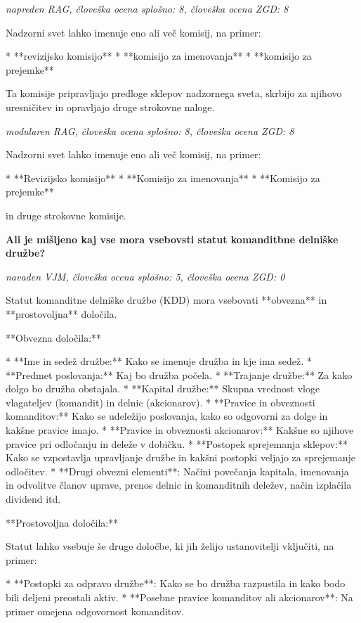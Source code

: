 \documentclass[a4paper,12pt,openright]{book}
\begin{document}
\vspace{0.5cm}
\textit{napreden RAG, človeška ocena splošno: 8, človeška ocena ZGD: 8}

Nadzorni svet lahko imenuje eno ali več komisij, na primer:

* **revizijsko komisijo**
* **komisijo za imenovanja**
* **komisijo za prejemke**


Ta komisije pripravljajo predloge sklepov nadzornega sveta, skrbijo za njihovo uresničitev in opravljajo druge strokovne naloge.

\vspace{0.5cm}
\textit{modularen RAG, človeška ocena splošno: 8, človeška ocena ZGD: 8}

Nadzorni svet lahko imenuje eno ali več komisij, na primer:

* **Revizijsko komisijo**
* **Komisijo za imenovanja**
* **Komisijo za prejemke**


in druge strokovne komisije.

\vspace{0.5cm}
\textbf{Ali je mišljeno kaj vse mora vsebovsti statut komanditbne delniške družbe?}

\textit{navaden VJM, človeška ocena splošno: 5, človeška ocena ZGD: 0}

Statut komanditne delniške družbe (KDD) mora vsebovati **obvezna** in **prostovoljna** določila.

**Obvezna določila:**

* **Ime in sedež družbe:** Kako se imenuje družba in kje ima sedež.
* **Predmet poslovanja:** Kaj bo družba počela.
* **Trajanje družbe:** Za kako dolgo bo družba obstajala.
* **Kapital družbe:** Skupna vrednost vloge vlagateljev (komandit) in delnic (akcionarov).
* **Pravice in obveznosti komanditov:** Kako se udeležijo poslovanja, kako so odgovorni za dolge in kakšne pravice imajo.
* **Pravice in obveznosti akcionarov:** Kakšne so njihove pravice pri odločanju in deleže v dobičku.
* **Postopek sprejemanja sklepov:** Kako se vzpostavlja upravljanje družbe in kakšni postopki veljajo za sprejemanje odločitev.
* **Drugi obvezni elementi**: Načini povečanja kapitala, imenovanja in odvolitve članov uprave, prenos delnic in komanditnih deležev, način izplačila dividend itd.

**Prostovoljna določila:**

Statut lahko vsebuje še druge določbe, ki jih želijo ustanovitelji vključiti, na primer:

* **Postopki za odpravo družbe**: Kako se bo družba razpustila in kako bodo bili deljeni preostali aktiv.
* **Posebne pravice komanditov ali akcionarov**: Na primer omejena odgovornost komanditov.
\end{document}
